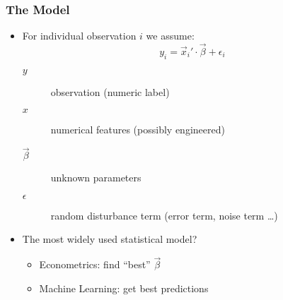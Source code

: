 \documentclass[mathserif, xcolor=table, svgnames]{beamer}
\begin{document}
\begin{frame}
  \frametitle{The Model}
  \begin{itemize}
  \item For individual observation $i$ we assume:
    \begin{equation*}
      y_{i} = \vec{x}_{i}' \cdot \vec{\beta} + \epsilon_{i}
    \end{equation*}
    \begin{description}
    \item[$y$] observation (numeric label)
    \item[$x$] numerical features (possibly engineered)
    \item[$\vec{\beta}$] unknown parameters
    \item[$\epsilon$] random disturbance term (error term, noise term \dots)
    \end{description}
  \item The most widely used statistical model?
    \begin{itemize}
    \item Econometrics: find ``best'' $\vec{\beta}$
    \item Machine Learning: get best predictions
    \end{itemize}
  \end{itemize}
\end{frame}
\end{document}
